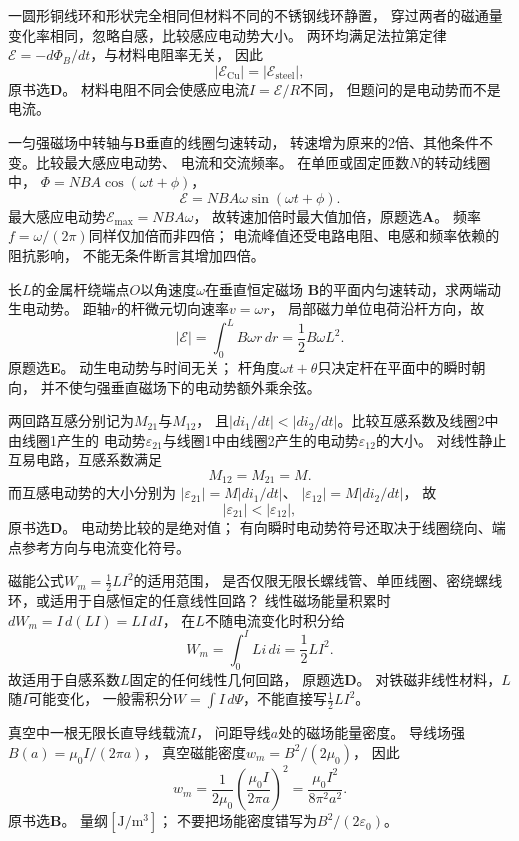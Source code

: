 \problemtext 一圆形铜线环和形状完全相同但材料不同的不锈钢线环静置，
穿过两者的磁通量变化率相同，忽略自感，比较感应电动势大小。
\workings
两环均满足法拉第定律
$\mathcal E=-d\Phi_B/dt$，与材料电阻率无关，
因此
\[
\boxed{|\mathcal E_{\mathrm{Cu}}|
=|\mathcal E_{\mathrm{steel}}|},
\]
原书选\textbf{D}。
\crosscheck 材料电阻不同会使感应电流$I=\mathcal E/R$不同，
但题问的是电动势而不是电流。

\problemtext 一匀强磁场中转轴与$\bm B$垂直的线圈匀速转动，
转速增为原来的2倍、其他条件不变。比较最大感应电动势、
电流和交流频率。
\workings
在单匝或固定匝数$N$的转动线圈中，
$\Phi=NBA\cos(\omega t+\phi)$，
\[
\mathcal E=NBA\omega\sin(\omega t+\phi).
\]
最大感应电动势$\mathcal E_{\max}=NBA\omega$，
故转速加倍时最大值加倍，原题选\textbf{A}。
\crosscheck 频率$f=\omega/(2\pi)$同样仅加倍而非四倍；
电流峰值还受电路电阻、电感和频率依赖的阻抗影响，
不能无条件断言其增加四倍。

\problemtext 长$L$的金属杆绕端点$O$以角速度$\omega$在垂直恒定磁场
$\bm B$的平面内匀速转动，求两端动生电动势。
\workings
距轴$r$的杆微元切向速率$v=\omega r$，
局部磁力单位电荷沿杆方向，故
\[
|\mathcal E|=\int_0^L B\omega r\,dr
=\boxed{\frac12B\omega L^2}.
\]
原题选\textbf{E}。
\crosscheck 动生电动势与时间无关；
杆角度$\omega t+\theta$只决定杆在平面中的瞬时朝向，
并不使匀强垂直磁场下的电动势额外乘余弦。

\problemtext 两回路互感分别记为$M_{21}$与$M_{12}$，
且$|di_1/dt|<|di_2/dt|$。比较互感系数及线圈2中由线圈1产生的
电动势$\varepsilon_{21}$与线圈1中由线圈2产生的电动势$\varepsilon_{12}$的大小。
\workings
对线性静止互易电路，互感系数满足
\[
\boxed{M_{12}=M_{21}=M}.
\]
而互感电动势的大小分别为
$|\varepsilon_{21}|=M|di_1/dt|$、
$|\varepsilon_{12}|=M|di_2/dt|$，
故
\[
\boxed{|\varepsilon_{21}|<|\varepsilon_{12}|},
\]
原书选\textbf{D}。
\crosscheck 电动势比较的是绝对值；
有向瞬时电动势符号还取决于线圈绕向、端点参考方向与电流变化符号。

\problemtext 磁能公式$W_m=\tfrac12LI^2$的适用范围，
是否仅限无限长螺线管、单匝线圈、密绕螺线环，或适用于自感恒定的任意线性回路？
\workings
线性磁场能量积累时
$dW_m=I\,d(LI)=LI\,dI$，
在$L$不随电流变化时积分给
\[
\boxed{W_m=\int_0^I L i\,di=\frac12LI^2}.
\]
故适用于自感系数$L$固定的任何线性几何回路，
原题选\textbf{D}。
\crosscheck 对铁磁非线性材料，$L$随$I$可能变化，
一般需积分$W=\int I\,d\Psi$，不能直接写$\tfrac12LI^2$。

\problemtext 真空中一根无限长直导线载流$I$，
问距导线$a$处的磁场能量密度。
\workings
导线场强
$B(a)=\mu_0I/(2\pi a)$，
真空磁能密度$w_m=B^2/(2\mu_0)$，
因此
\[
\boxed{w_m=\frac1{2\mu_0}
\left(\frac{\mu_0I}{2\pi a}\right)^2
=\frac{\mu_0I^2}{8\pi^2a^2}}.
\]
原书选\textbf{B}。
\crosscheck 量纲$[\mathrm{J/m^3}]$；
不要把场能密度错写为$B^2/(2\varepsilon_0)$。

